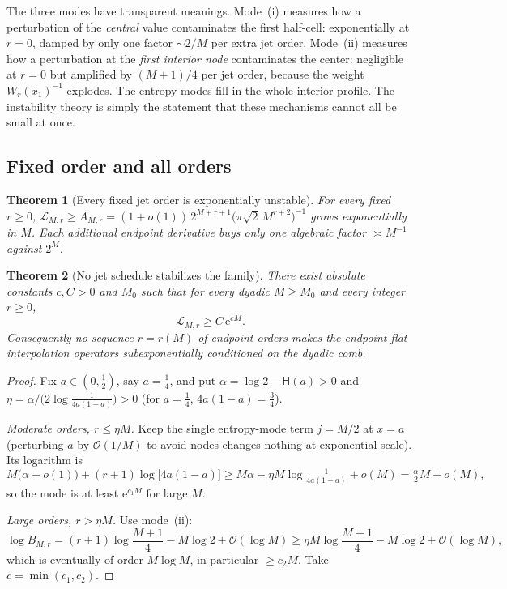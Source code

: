 \documentclass[11pt,oneside]{article}
\numberwithin{equation}{section}
\newtheorem{theorem}{Theorem}[section]
\theoremstyle{definition}
\theoremstyle{remark}
\newcommand{\e}{\mathrm e}
\newcommand{\bigO}{\mathcal O}
\newcommand{\smallo}{o}
\newcommand{\Leb}{\mathscr L}
\newcommand{\Hyp}{\mathsf H}
\begin{document}
The three modes have transparent meanings.  Mode~(i) measures how a
perturbation of the \emph{central} value contaminates the first
half-cell: exponentially at $r=0$, damped by only one factor
$\sim2/M$ per extra jet order.  Mode~(ii) measures how a perturbation
at the \emph{first interior node} contaminates the center: negligible
at $r=0$ but amplified by $(M+1)/4$ per jet order, because the weight
$W_r(x_1)^{-1}$ explodes.  The entropy modes fill in the whole
interior profile.  The instability theory is simply the statement
that these mechanisms cannot all be small at once.

\subsection{Fixed order and all orders}

\begin{theorem}[Every fixed jet order is exponentially unstable]
\label{thm:fixed-r}
For every fixed $r\ge0$,
$\Leb_{M,r}\ge A_{M,r}
=(1+\smallo(1))\,2^{M+r+1}\bigl(\pi\sqrt2\,M^{r+2}\bigr)^{-1}$
grows exponentially in $M$.  Each additional endpoint derivative
buys only one algebraic factor $\asymp M^{-1}$ against $2^{M}$.
\end{theorem}

\begin{theorem}[No jet schedule stabilizes the family]
\label{thm:all-r}
There exist absolute constants $c,C>0$ and $M_0$ such that for every
dyadic $M\ge M_0$ and \emph{every} integer $r\ge0$,
\begin{equation}
 \boxed{\;\Leb_{M,r}\ge C\,\e^{cM}.\;}
 \label{eq:all-r}
\end{equation}
Consequently no sequence $r=r(M)$ of endpoint orders makes the
endpoint-flat interpolation operators subexponentially conditioned on
the dyadic comb.
\end{theorem}

\begin{proof}
Fix $a\in(0,\tfrac12)$, say $a=\tfrac14$, and put
$\alpha=\log2-\Hyp(a)>0$ and
$\eta=\alpha/\bigl(2\log\tfrac1{4a(1-a)}\bigr)>0$ (for
$a=\tfrac14$, $4a(1-a)=\tfrac34$).

\emph{Moderate orders, $r\le\eta M$.}  Keep the single entropy-mode
term $j=M/2$ at $x=a$ (perturbing $a$ by $\bigO(1/M)$ to avoid nodes
changes nothing at exponential scale).  Its logarithm is
\[
 M\bigl(\alpha+\smallo(1)\bigr)
 +(r+1)\log\bigl[4a(1-a)\bigr]
 \ge M\alpha-\eta M\log\tfrac1{4a(1-a)}+\smallo(M)
 =\tfrac{\alpha}2M+\smallo(M),
\]
so the mode is at least $\e^{c_1M}$ for large $M$.

\emph{Large orders, $r>\eta M$.}  Use mode~(ii):
\[
 \log B_{M,r}
 =(r+1)\log\frac{M+1}{4}-M\log2+\bigO(\log M)
 \ge \eta M\log\frac{M+1}{4}-M\log2+\bigO(\log M),
\]
which is eventually of order $M\log M$, in particular
$\ge c_2M$.  Take $c=\min(c_1,c_2)$.
\end{proof}
\end{document}
